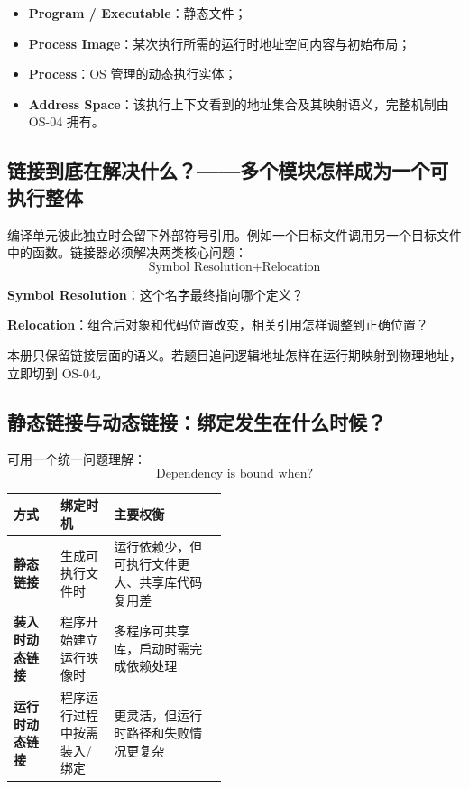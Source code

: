\documentclass[11pt,a4paper]{ctexart}
\newcommand{\kw}[1]{\textbf{#1}}
\begin{document}
\begin{warn}[四个对象不能混]
\begin{itemize}
  \item \kw{Program / Executable}：静态文件；
  \item \kw{Process Image}：某次执行所需的运行时地址空间内容与初始布局；
  \item \kw{Process}：OS 管理的动态执行实体；
  \item \kw{Address Space}：该执行上下文看到的地址集合及其映射语义，完整机制由 OS-04 拥有。
\end{itemize}
\end{warn}

\subsection{链接到底在解决什么？——多个模块怎样成为一个可执行整体}

编译单元彼此独立时会留下外部符号引用。例如一个目标文件调用另一个目标文件中的函数。链接器必须解决两类核心问题：
\[
\boxed{\text{Symbol Resolution} + \text{Relocation}}
\]

\kw{Symbol Resolution}：这个名字最终指向哪个定义？

\kw{Relocation}：组合后对象和代码位置改变，相关引用怎样调整到正确位置？

本册只保留链接层面的语义。若题目追问逻辑地址怎样在运行期映射到物理地址，立即切到 OS-04。

\subsection{静态链接与动态链接：绑定发生在什么时候？}

可用一个统一问题理解：
\[
\boxed{\text{Dependency is bound when?}}
\]

\begin{center}
\begin{tabularx}{\linewidth}{>{\bfseries}p{0.22\linewidth} p{0.25\linewidth} X}
\toprule
方式 & 绑定时机 & 主要权衡\\
\midrule
静态链接 & 生成可执行文件时 & 运行依赖少，但可执行文件更大、共享库代码复用差\\
装入时动态链接 & 程序开始建立运行映像时 & 多程序可共享库，启动时需完成依赖处理\\
运行时动态链接 & 程序运行过程中按需装入/绑定 & 更灵活，但运行时路径和失败情况更复杂\\
\bottomrule
\end{tabularx}
\end{center}
\end{document}
